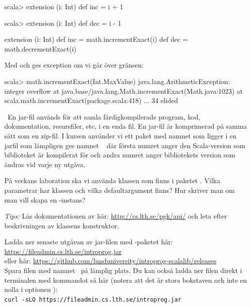 \SubtaskSolved 
\begin{REPLnonum}
scala> extension (i: Int) def inc = i + 1
\end{REPLnonum}

\SubtaskSolved 
\begin{REPLnonum}
scala> extension (i: Int) def dec = i - 1
\end{REPLnonum}

\SubtaskSolved 
\begin{Code}
extension (i: Int) 
  def inc = math.incrementExact(i)
  def dec = math.decrementExact(i)
\end{Code}

\SubtaskSolved Med   och  ges exception om vi går över gränsen:
\begin{REPLnonum}
scala> math.incrementExact(Int.MaxValue)
java.lang.ArithmeticException: integer overflow
  at java.base/java.lang.Math.incrementExact(Math.java:1023)
  at scala.math.incrementExact(package.scala:418)
  ... 34 elided
\end{REPLnonum}


\QUESTEND



\QUESTBEGIN

\Task \what~En jar-fil används för att samla färdigkompilerade program, kod, dokumentation, resursfiler, etc, i en enda fil. En jar-fil är komprimerad på samma sätt som en zip-fil. I kursen använder vi ett paket med namnet  som ligger i en jarfil som lämpligen ges namnet \LibJar~ där första numret anger den Scala-version som biblioteket är kompilerat för och andra numret anger bibliotekets version som ändras vid varje ny utgåva.

\Subtask På veckans laboration ska vi använda klassen  som finns i paketet . Vilka parametrar har klassen  och vilka defaultargument finns? Hur skriver man om man vill skapa en -instans?

\emph{Tips:}  Läs dokumentationen av  här: \url{http://cs.lth.se/pgk/api/}
och leta efter beskrivningen av klassens konstruktor.

\Subtask Ladda ner senaste utgåvan av jar-filen med -paketet här:
\\\url{https://fileadmin.cs.lth.se/introprog.jar}\\eller här: \url{https://github.com/lunduniversity/introprog-scalalib/releases}
\\ Spara filen med namnet  \LibJar~på lämplig plats. Du kan också ladda ner filen direkt i terminalen med kommandot  så här (notera att det är stora bokstaven  och inte en nolla i optionen ):\\
\texttt{curl -sLO https://fileadmin.cs.lth.se/introprog.jar}

